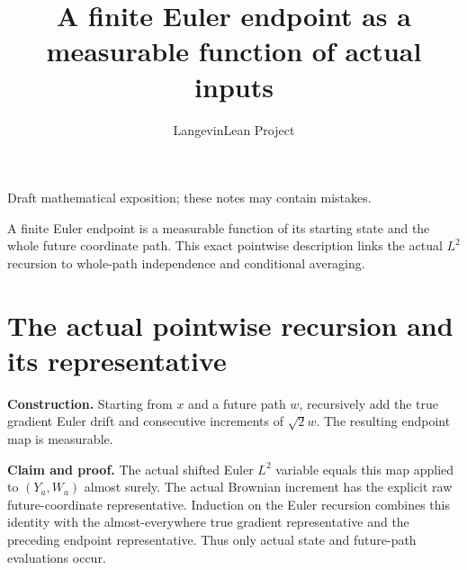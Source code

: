 \documentclass[11pt,a4paper]{article}
\title{\texorpdfstring{A finite Euler endpoint as a measurable function of actual inputs}{A finite Euler endpoint as a measurable function of actual inputs}}
\author{LangevinLean Project}
\date{}
\begin{document}
\maketitle
Draft mathematical exposition; these notes may contain mistakes.


A finite Euler endpoint is a measurable function of its starting state and the whole future coordinate path. This exact pointwise description links the actual \(L^2\) recursion to whole-path independence and conditional averaging.


\section{\texorpdfstring{The actual pointwise recursion and its representative}{The actual pointwise recursion and its representative}}


\textbf{Construction.} Starting from \(x\) and a future path \(w\), recursively add the true gradient Euler drift and consecutive increments of \(\sqrt2w\). The resulting endpoint map is measurable.



\textbf{Claim and proof.} The actual shifted Euler \(L^2\) variable equals this map applied to \((Y_a,W_a)\) almost surely. The actual Brownian increment has the explicit raw future-coordinate representative. Induction on the Euler recursion combines this identity with the almost-everywhere true gradient representative and the preceding endpoint representative. Thus only actual state and future-path evaluations occur.
\end{document}
